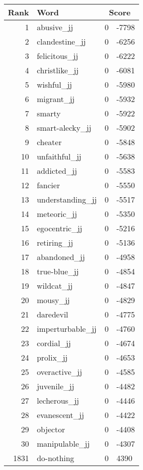 \begin{longtable}[!htbp]{| rlr@{.}l |}
    \hline
    \textbf{Rank} & \textbf{Word} & \multicolumn{2}{c|}{\textbf{Score}} \\
    \hline
    \endhead
    1 & abusive\_jj & 0 & -7798 \\
    2 & clandestine\_jj & 0 & -6256 \\
    3 & felicitous\_jj & 0 & -6222 \\
    4 & christlike\_jj & 0 & -6081 \\
    5 & wishful\_jj & 0 & -5980 \\
    6 & migrant\_jj & 0 & -5932 \\
    7 & smarty & 0 & -5922 \\
    8 & smart-alecky\_jj & 0 & -5902 \\
    9 & cheater & 0 & -5848 \\
    10 & unfaithful\_jj & 0 & -5638 \\
    11 & addicted\_jj & 0 & -5583 \\
    12 & fancier & 0 & -5550 \\
    13 & understanding\_jj & 0 & -5517 \\
    14 & meteoric\_jj & 0 & -5350 \\
    15 & egocentric\_jj & 0 & -5216 \\
    16 & retiring\_jj & 0 & -5136 \\
    17 & abandoned\_jj & 0 & -4958 \\
    18 & true-blue\_jj & 0 & -4854 \\
    19 & wildcat\_jj & 0 & -4847 \\
    20 & mousy\_jj & 0 & -4829 \\
    21 & daredevil & 0 & -4775 \\
    22 & imperturbable\_jj & 0 & -4760 \\
    23 & cordial\_jj & 0 & -4674 \\
    24 & prolix\_jj & 0 & -4653 \\
    25 & overactive\_jj & 0 & -4585 \\
    26 & juvenile\_jj & 0 & -4482 \\
    27 & lecherous\_jj & 0 & -4446 \\
    28 & evanescent\_jj & 0 & -4422 \\
    29 & objector & 0 & -4408 \\
    30 & manipulable\_jj & 0 & -4307 \\
    1831 & do-nothing & 0 & 4390 \\

\end{longtable}
